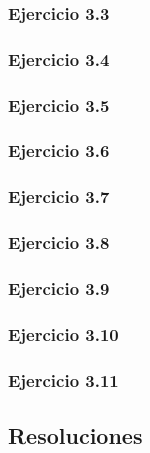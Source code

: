 \subsubsection{Ejercicio 3.3}


\subsubsection{Ejercicio 3.4}


\subsubsection{Ejercicio 3.5}


\subsubsection{Ejercicio 3.6}


\subsubsection{Ejercicio 3.7}


\subsubsection{Ejercicio 3.8}


\subsubsection{Ejercicio 3.9}


\subsubsection{Ejercicio 3.10}


\subsubsection{Ejercicio 3.11}


\subsection{Resoluciones}

